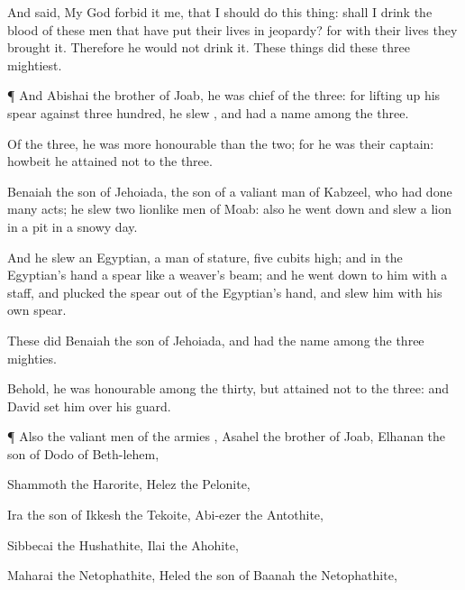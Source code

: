{And
said, My
God
forbid it me, that I should
do this
thing: shall I
drink the
blood of these
men that have put their lives in
jeopardy? for with
{} their
lives they
brought it. Therefore he
would not
drink it. These things
did these
three
mightiest.


\par }{\PP {}¶ And
Abishai the
brother of
Joab, he was
chief of the
three: for lifting
up his
spear against
three
hundred, he
slew
{}, and had a
name among the
three.

Of the
three, he was more
honourable than the
two; for he was their
captain: howbeit he
attained not to the
{}
three.

Benaiah the
son of
Jehoiada, the
son of a
valiant
man of
Kabzeel, who had done
many
acts; he
slew
two lionlike
men of
Moab: also he went
down and
slew a
lion
in a
pit in a
snowy
day.

And he
slew an
Egyptian, a
man of
{}
stature,
five
cubits high; and in the
Egyptian’s
hand
{} a
spear like a
weaver’s
beam; and he went
down to him with a
staff, and
plucked the
spear out of the
Egyptian’s
hand, and
slew him with his own
spear.

These
{}
did
Benaiah the
son of
Jehoiada, and had the
name among the
three
mighties.

Behold, he was
honourable among the
thirty, but
attained not to the
{}
three: and
David
set him over his
guard.


\par }{\PP {}¶ Also the valiant
men of the
armies
{},
Asahel the
brother of
Joab,
Elhanan the
son of
Dodo of
Beth-lehem,

Shammoth the
Harorite,
Helez the
Pelonite,

Ira the
son of
Ikkesh the
Tekoite,
Abi-ezer the
Antothite,

Sibbecai the
Hushathite,
Ilai the
Ahohite,

Maharai the
Netophathite,
Heled the
son of
Baanah the
Netophathite,

}
